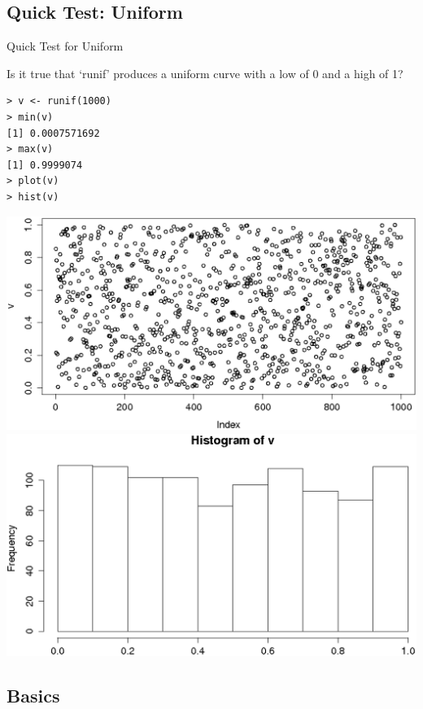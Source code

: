 \documentclass{beamer}
\begin{document}
\subsection{Quick Test: Uniform}
\begin{frame}[fragile]{Quick Test for Uniform}

Is it true that `runif' produces a uniform curve with a low of 0 and a high of 1?

\begin{footnotesize}
\begin{verbatim}
> v <- runif(1000)
> min(v)
[1] 0.0007571692
> max(v)
[1] 0.9999074
> plot(v)
> hist(v)
\end{verbatim}
\end{footnotesize}

\includegraphics[scale=0.24]{uniform_plot.eps}
\includegraphics[scale=0.24]{uniform_hist.eps}

\end{frame}

\subsection{Basics}
\end{document}
